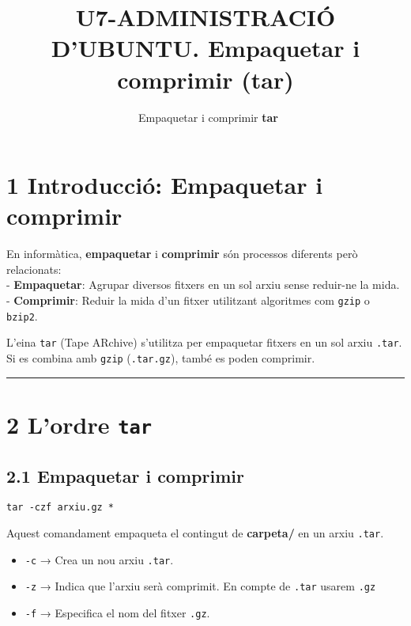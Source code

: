 \documentclass[
  12 pt,
  a4paper,
]{article}
\title{U7-ADMINISTRACIÓ D'UBUNTU. Empaquetar i comprimir (tar)}
\subtitle{~Empaquetar i comprimir \textbf{tar}}
\author{}
\date{\vspace{-2.5em}}
\providecommand{\tightlist}{%
  \setlength{\itemsep}{0pt}\setlength{\parskip}{0pt}}
\begin{document}
\maketitle

\section{1 Introducció: Empaquetar i
comprimir}\label{introducciuxf3-empaquetar-i-comprimir}

En informàtica, \textbf{empaquetar} i \textbf{comprimir} són processos
diferents però relacionats:\\
- \textbf{Empaquetar}: Agrupar diversos fitxers en un sol arxiu sense
reduir-ne la mida.\\
- \textbf{Comprimir}: Reduir la mida d'un fitxer utilitzant algoritmes
com \texttt{gzip} o \texttt{bzip2}.

L'eina \texttt{tar} (Tape ARchive) s'utilitza per empaquetar fitxers en
un sol arxiu \texttt{.tar}. Si es combina amb \texttt{gzip}
(\texttt{.tar.gz}), també es poden comprimir.

\begin{center}\rule{0.5\linewidth}{0.5pt}\end{center}

\section{\texorpdfstring{2 L'ordre
\texttt{tar}}{2 L'ordre tar}}\label{lordre-tar}

\subsection{2.1 Empaquetar i comprimir}\label{empaquetar-i-comprimir}

\texttt{tar\ -czf\ arxiu.gz\ *}

Aquest comandament empaqueta el contingut de \textbf{carpeta/} en un
arxiu \texttt{.tar}.

\begin{itemize}
\tightlist
\item
  \texttt{-c} → Crea un nou arxiu \texttt{.tar}.\\
\item
  \texttt{-z} → Indica que l'arxiu serà comprimit. En compte de
  \texttt{.tar} usarem \texttt{.gz}
\item
  \texttt{-f} → Especifica el nom del fitxer \texttt{.gz}.
\end{itemize}
\end{document}

